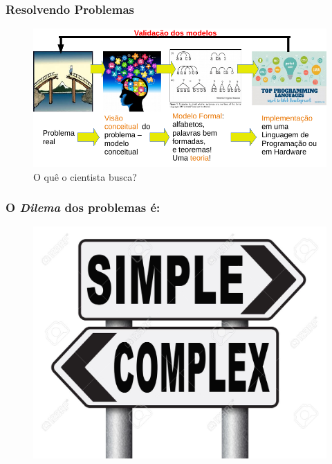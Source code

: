 \documentclass[10pt]{beamer}
\begin{document}
\begin{frame}[fragile]

\frametitle{Resolvendo Problemas}

\begin{figure}[!ht]
	\centering
	\includegraphics[height =.65\textheight,width=\textwidth]
	{figuras/problem_implementation.pdf}
	\caption{O  quê o cientista busca?}
\end{figure}



\end{frame}



\begin{frame}[fragile]

\frametitle{O \emph{Dilema} dos problemas  é:}

\begin{figure}[!ht]
\centering
\includegraphics[height =.65\textheight,width=.8\textwidth]
{figuras/dilema_eh.jpg}
\end{figure}

\end{frame}
\end{document}
